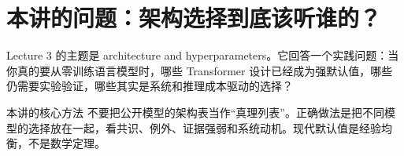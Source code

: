 \section{本讲的问题：架构选择到底该听谁的？}
Lecture 3 的主题是 architecture and hyperparameters。它回答一个实践问题：当你真的要从零训练语言模型时，哪些 Transformer 设计已经成为强默认值，哪些仍需要实验验证，哪些其实是系统和推理成本驱动的选择？
\begin{importantbox}{本讲的核心方法}
不要把公开模型的架构表当作“真理列表”。正确做法是把不同模型的选择放在一起，看共识、例外、证据强弱和系统动机。现代默认值是经验均衡，不是数学定理。
\end{importantbox}
